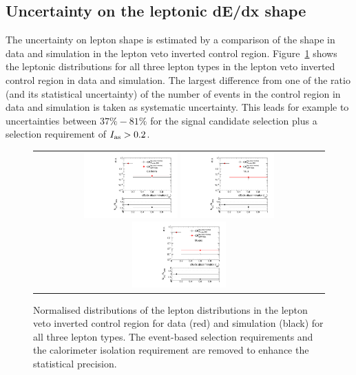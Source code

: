 \subsection{Uncertainty on the leptonic dE/dx shape}
\label{sec:LeptonIasUncertainty}

The uncertainty on lepton \ias shape is estimated by a comparison of the \ias shape in data and simulation in the lepton veto inverted control region.
Figure~\ref{fig:LeptonIasUnc} shows the leptonic \ias distributions for all three lepton types in the lepton veto inverted control region in data and simulation.
The largest difference from one  of the ratio (and its statistical uncertainty) of the number of events in the control region in data and simulation is taken as systematic uncertainty.
This leads for example to uncertainties between $37\%-81\%$ for the signal candidate selection plus a selection requirement of $I_{\text{as}}>0.2$.
\begin{figure}[!h]
  \centering 
  \begin{tabular}{c}
    \includegraphics[width=0.33\textwidth]{figures/analysis_2/Background/hASmi_SRbinning_Electrons_MCCR_DataCR.pdf}
    \includegraphics[width=0.33\textwidth]{figures/analysis_2/Background/hASmi_SRbinning_Taus_MCCR_DataCR.pdf}
    \includegraphics[width=0.33\textwidth]{figures/analysis_2/Background/hASmi_SRbinning_Muons_MCCR_DataCR.pdf}
  \end{tabular}
  \caption{Normalised distributions of the lepton \ias distributions in the lepton veto inverted control region for data (red) and simulation (black) for all three lepton types. 
           The event-based selection requirements and the calorimeter isolation requirement are removed to enhance the statistical precision.}
  \label{fig:LeptonIasUnc}
\end{figure}

